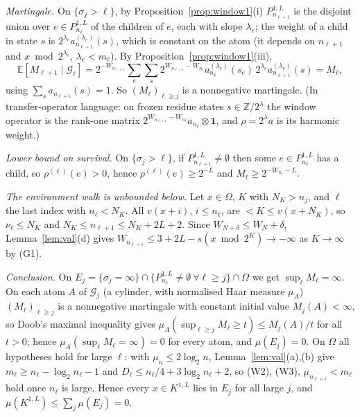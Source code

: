 \documentclass[11pt]{amsart}
\theoremstyle{definition}
\newcommand{\Z}{\mathbb Z}
\newcommand{\E}{\mathbb E}
\begin{document}
\emph{Martingale.} On $\{\sigma_j>\ell\}$, by Proposition~\ref{prop:window1}(i) $P^{1,L}_{n_{\ell+1}}$ is the disjoint union over
$e\in P^{1,L}_{n_\ell}$ of the children of $e$, each with slope $\lambda_e$; the weight of a child in state $s$ is $2^{\lambda_e}a^{(\lambda_e)}_{n_{\ell+1}}(s)$,
which is constant on the atom (it depends on $n_{\ell+1}$ and $x\bmod2^{\lambda_e}$, $\lambda_e<m_\ell$). By Proposition~\ref{prop:window1}(iii),
\[ \E[M_{\ell+1}\mid\mathcal G_\ell]=2^{-W_{n_{\ell+1}}}\sum_{e}\sum_{s}2^{W_{n_{\ell+1}}-W_{n_\ell}}a^{(\lambda_e)}_{n_\ell}(s_e)\,
2^{\lambda_e}a^{(\lambda_e)}_{n_{\ell+1}}(s)=M_\ell, \]
using $\sum_sa_{n_{\ell+1}}(s)=1$. So $(M_\ell)_{\ell\ge j}$ is a nonnegative martingale. (In transfer-operator language: on frozen
residue states $s\in\Z/2^\lambda$ the window operator is the rank-one matrix $2^{W_{n_{\ell+1}}-W_{n_\ell}}a_{n_\ell}\otimes\mathbf 1$, and
$\rho=2^\lambda a$ is its harmonic weight.)

\emph{Lower bound on survival.} On $\{\sigma_j>\ell\}$, if $P^{1,L}_{n_{\ell+1}}\neq\emptyset$ then some $e\in P^{1,L}_{n_\ell}$ has a child, so
$\rho^{(\ell)}(e)>0$, hence $\rho^{(\ell)}(e)\ge2^{-L}$ and $M_\ell\ge2^{-W_{n_\ell}-L}$.

\emph{The environment walk is unbounded below.} Let $x\in\Omega$, $K$ with $N_K>n_j$, and $\ell$ the last index with $n_\ell<N_K$. All $v(x+i)$,
$i\le n_\ell$, are $<K\le v(x+N_K)$, so $\nu_\ell\le N_K$ and $N_K\le n_{\ell+1}\le N_K+2L+2$. Since $W_{N+\delta}\le W_N+\delta$,
Lemma~\ref{lem:val}(d) gives $W_{n_{\ell+1}}\le3+2L-s(x\bmod2^K)\to-\infty$ as $K\to\infty$ by (G1).

\emph{Conclusion.} On $E_j=\{\sigma_j=\infty\}\cap\{P^{1,L}_{n_\ell}\ne\emptyset\ \forall\ell\ge j\}\cap\Omega$ we get $\sup_\ell M_\ell=\infty$.
On each atom $A$ of $\mathcal G_j$ (a cylinder, with normalised Haar measure $\mu_A$) $(M_\ell)_{\ell\ge j}$ is a nonnegative martingale
with constant initial value $M_j(A)<\infty$, so Doob's maximal inequality gives $\mu_A(\sup_{\ell\ge j}M_\ell\ge t)\le M_j(A)/t$ for all $t>0$;
hence $\mu_A(\sup_\ell M_\ell=\infty)=0$ for every atom, and $\mu(E_j)=0$. On $\Omega$ all hypotheses
hold for large $\ell$: with $\mu_n\le2\log_2n$, Lemma~\ref{lem:val}(a),(b) give $m_\ell\ge n_\ell-\log_2n_\ell-1$ and
$D_\ell\le n_\ell/4+3\log_2n_\ell+2$, so (W2), (W3), $\mu_{n_{\ell+1}}<m_\ell$ hold once $n_\ell$ is large. Hence every $x\in K^{1,L}$
lies in $E_j$ for all large $j$, and $\mu(K^{1,L})\le\sum_j\mu(E_j)=0$.
\end{document}

